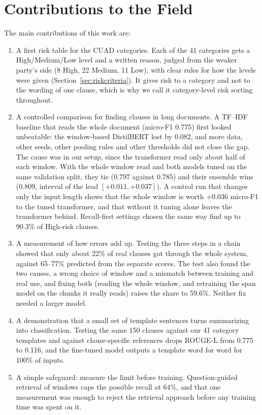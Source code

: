 \section{Contributions to the Field}
\label{sec:contributions}
The main contributions of this work are:
\begin{enumerate}[itemsep=2pt]
  \item A first risk table for the CUAD categories. Each of the 41 categories gets a High\slash Medium\slash Low level and a written reason, judged from the weaker party's side (8 High, 22 Medium, 11 Low), with clear rules for how the levels were given (Section~\ref{sec:riskcriteria}). It gives risk to a category and not to the wording of one clause, which is why we call it category-level risk sorting throughout.
  \item A controlled comparison for finding clauses in long documents. A TF--IDF baseline that reads the whole document (micro-F1 0.775) first looked unbeatable: the window-based DistilBERT lost by 0.082, and more data, other seeds, other pooling rules and other thresholds did not close the gap. The cause was in our setup, since the transformer read only about half of each window. With the whole window read and both models tuned on the same validation split, they tie (0.797 against 0.785) and their ensemble wins (0.809, interval of the lead $[+0.011, +0.037]$). A control run that changes only the input length shows that the whole window is worth $+0.036$ micro-F1 to the tuned transformer, and that without it tuning alone leaves the transformer behind. Recall-first settings chosen the same way find up to 90.3\% of High-risk clauses.
  \item A measurement of how errors add up. Testing the three steps in a chain showed that only about 22\% of real clauses got through the whole system, against 65--77\% predicted from the separate scores. The test also found the two causes, a wrong choice of window and a mismatch between training and real use, and fixing both (reading the whole window, and retraining the span model on the chunks it really reads) raises the share to 59.6\%. Neither fix needed a larger model.
  \item A demonstration that a small set of template sentences turns summarizing into classification. Testing the same 150 clauses against our 41 category templates and against clause-specific references drops ROUGE-L from 0.775 to 0.116, and the fine-tuned model outputs a template word for word for 100\% of inputs.
  \item A simple safeguard: measure the limit before training. Question-guided retrieval of windows caps the possible recall at 64\%, and that one measurement was enough to reject the retrieval approach before any training time was spent on it.

\end{enumerate}

